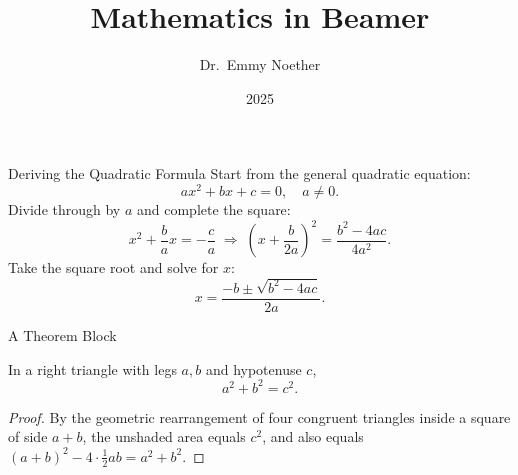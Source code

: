 \documentclass{beamer}
\title{Mathematics in Beamer}
\author{Dr.~Emmy Noether}
\institute{University of Erlangen}
\date{2025}
\begin{document}
\begin{frame}
  \titlepage
\end{frame}

\begin{frame}{Deriving the Quadratic Formula}
  Start from the general quadratic equation:
  \[
    ax^2 + bx + c = 0, \quad a \neq 0.
  \]
  \pause
  Divide through by $a$ and complete the square:
  \[
    x^2 + \frac{b}{a}x = -\frac{c}{a}
    \;\Longrightarrow\;
    \left(x + \frac{b}{2a}\right)^2 = \frac{b^2 - 4ac}{4a^2}.
  \]
  \pause
  Take the square root and solve for $x$:
  \[
    x = \frac{-b \pm \sqrt{b^2 - 4ac}}{2a}.
  \]
\end{frame}

\begin{frame}{A Theorem Block}
  \begin{theorem}[Pythagoras]
    In a right triangle with legs $a, b$ and hypotenuse $c$,
    \[
      a^2 + b^2 = c^2.
    \]
  \end{theorem}

  \begin{proof}
    By the geometric rearrangement of four congruent triangles
    inside a square of side $a + b$, the unshaded area equals
    $c^2$, and also equals $(a+b)^2 - 4\cdot\tfrac{1}{2}ab
    = a^2 + b^2$.
  \end{proof}
\end{frame}
\end{document}
